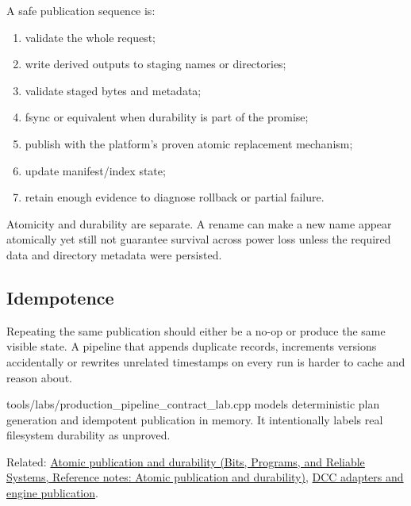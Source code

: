 A safe publication sequence is:

\begin{enumerate}
\def\labelenumi{\arabic{enumi}.}
\tightlist
\item
  validate the whole request;
\item
  write derived outputs to staging names or directories;
\item
  validate staged bytes and metadata;
\item
  fsync or equivalent when durability is part of the promise;
\item
  publish with the platform's proven atomic replacement mechanism;
\item
  update manifest/index state;
\item
  retain enough evidence to diagnose rollback or partial failure.
\end{enumerate}

Atomicity and durability are separate. A rename can make a new name appear atomically yet still not guarantee survival across power loss unless the required data and directory metadata were persisted.

\subsection{Idempotence}\label{appendix-91eaa3cbdbc3-idempotence}

Repeating the same publication should either be a no-op or produce the same visible state. A pipeline that appends duplicate records, increments versions accidentally or rewrites unrelated timestamps on every run is harder to cache and reason about.

tools/labs/production\_pipeline\_contract\_lab.cpp models deterministic plan generation and idempotent publication in memory. It intentionally labels real filesystem durability as unproved.

Related: \href{../01-Bits-Programs-and-Reliable-Systems/main.pdf\#nameddest=appendix-e89a8f290ef5}{Atomic publication and durability (Bits, Programs, and Reliable Systems, Reference notes: Atomic publication and durability)}, \hyperref[appendix-03ade9e1875f]{DCC adapters and engine publication}.
